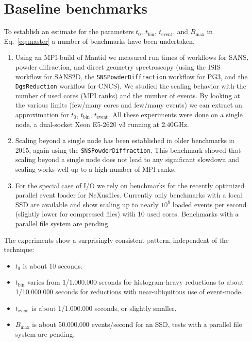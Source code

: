 \documentclass[a4paper,english,numbers=noenddot,bibliography=totoc,chapterprefix=on,DIV=12]{scrartcl}
\newcommand{\Tbin}{t_{\text{bin}}}
\newcommand{\Tevent}{t_{\text{event}}}
\newcommand{\Bmax}{B_{\text{max}}}
\newcommand{\nexus}{NeXus}
\begin{document}
\section{Baseline benchmarks}

To establish an estimate for the parameters $t_0$, $\Tbin$, $\Tevent$, and $\Bmax$ in Eq.~\eqref{eq:master} a number of benchmarks have been undertaken.

\begin{enumerate}
  \item Using an MPI-build of Mantid we measured run times of workflows for SANS, powder diffraction, and direct geometry spectroscopy (using the ISIS workflow for SANS2D, the \verb|SNSPowderDiffraction| workflow for PG3, and the \verb|DgsReduction| workflow for CNCS).
    We studied the scaling behavior with the number of used cores (MPI ranks) and the number of events.
    By looking at the various limits (few/many cores and few/many events) we can extract an approximation for $t_0$, $\Tbin$, $\Tevent$.
    All these experiments were done on a single node, a dual-socket Xeon E5-2620 v3 running at 2.40GHz.
  \item Scaling beyond a single node has been established in older benchmarks in 2015, again using the \verb|SNSPowderDiffraction|.
    This benchmark showed that scaling beyond a single node does not lead to any significant slowdown and scaling works well up to a high number of MPI ranks.
  \item For the special case of I/O we rely on benchmarks for the recently optimized parallel event loader for \nexus files.
    Currently only benchmarks with a local SSD are available and show scaling up to nearly $10^8$ loaded events per second (slightly lower for compressed files) with 10 used cores.
    Benchmarks with a parallel file system are pending.
\end{enumerate}
The experiments show a surprisingly consistent pattern, independent of the technique:

\begin{itemize}
\item $t_0$ is about 10 seconds.
\item $\Tbin$ varies from 1/1.000.000 seconds for histogram-heavy reductions to about 1/10.000.000 seconds for reductions with near-ubiquitous use of event-mode.
\item $\Tevent$ is about 1/1.000.000 seconds, or slightly smaller.
\item $\Bmax$ is about 50.000.000 events/second for an SSD, tests with a parallel file system are pending.
\end{itemize}
\end{document}
